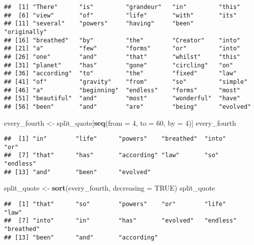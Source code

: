 \documentclass[]{article}
\newenvironment{Shaded}{\begin{snugshade}}{\end{snugshade}}
\newcommand{\KeywordTok}[1]{\textcolor[rgb]{0.13,0.29,0.53}{\textbf{#1}}}
\newcommand{\DataTypeTok}[1]{\textcolor[rgb]{0.13,0.29,0.53}{#1}}
\newcommand{\DecValTok}[1]{\textcolor[rgb]{0.00,0.00,0.81}{#1}}
\newcommand{\StringTok}[1]{\textcolor[rgb]{0.31,0.60,0.02}{#1}}
\newcommand{\OtherTok}[1]{\textcolor[rgb]{0.56,0.35,0.01}{#1}}
\newcommand{\NormalTok}[1]{#1}
\begin{document}
\begin{verbatim}
##  [1] "There"      "is"         "grandeur"   "in"         "this"      
##  [6] "view"       "of"         "life"       "with"       "its"       
## [11] "several"    "powers"     "having"     "been"       "originally"
## [16] "breathed"   "by"         "the"        "Creator"    "into"      
## [21] "a"          "few"        "forms"      "or"         "into"      
## [26] "one"        "and"        "that"       "whilst"     "this"      
## [31] "planet"     "has"        "gone"       "circling"   "on"        
## [36] "according"  "to"         "the"        "fixed"      "law"       
## [41] "of"         "gravity"    "from"       "so"         "simple"    
## [46] "a"          "beginning"  "endless"    "forms"      "most"      
## [51] "beautiful"  "and"        "most"       "wonderful"  "have"      
## [56] "been"       "and"        "are"        "being"      "evolved"
\end{verbatim}

\begin{Shaded}
\begin{Highlighting}[]
\NormalTok{every_fourth <-}\StringTok{ }\NormalTok{split_quote[}\KeywordTok{seq}\NormalTok{(}\DataTypeTok{from =} \DecValTok{4}\NormalTok{, }\DataTypeTok{to =} \DecValTok{60}\NormalTok{, }\DataTypeTok{by =} \DecValTok{4}\NormalTok{)]}
\NormalTok{every_fourth}
\end{Highlighting}
\end{Shaded}

\begin{verbatim}
##  [1] "in"        "life"      "powers"    "breathed"  "into"      "or"       
##  [7] "that"      "has"       "according" "law"       "so"        "endless"  
## [13] "and"       "been"      "evolved"
\end{verbatim}

\begin{Shaded}
\begin{Highlighting}[]
\NormalTok{split_quote <-}\StringTok{ }\KeywordTok{sort}\NormalTok{(every_fourth, }\DataTypeTok{decreasing =} \OtherTok{TRUE}\NormalTok{)}
\NormalTok{split_quote}
\end{Highlighting}
\end{Shaded}

\begin{verbatim}
##  [1] "that"      "so"        "powers"    "or"        "life"      "law"      
##  [7] "into"      "in"        "has"       "evolved"   "endless"   "breathed" 
## [13] "been"      "and"       "according"
\end{verbatim}
\end{document}
